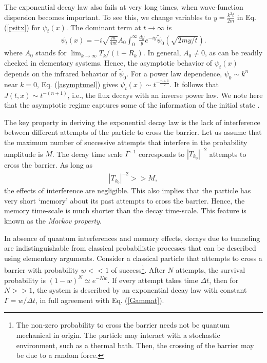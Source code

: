 \documentclass[12pt]{article}
\numberwithin{equation}{section}
\begin{document}
The exponential decay law also fails at very long times, when wave-function dispersion becomes important. To see this, we change variables to  $y = \frac{k^2t}{2m}$ in Eq. (\ref{psitx}) for $\psi_t(x)$. The dominant term at $t \rightarrow \infty$ is
\begin{eqnarray}
\psi_t(x) =  - i \sqrt{\frac{m}{4\pi t}} A_0  \int_0^{\infty} \frac{dy}{y}  e^{-iy} \tilde{\psi}_0(\sqrt{2my/t}). \label{asymptunel}
\end{eqnarray}
where $A_0 $ stands for $\lim_{k\rightarrow \infty} T_k/(1+R_k)$. In general, $A_0 \neq 0$, as can be readily checked in elementary systems. Hence, the asymptotic behavior of $\psi_t(x)$ depends on  the infrared behavior of $\tilde{\psi}_0$. For  a power law dependence, $\psi_0 \sim k^n$ near $k = 0$, Eq. (\ref{asymptunel}) gives $\psi_t(x) \sim t^{-\frac{n+1}{2}}$. It follows that $J(t, x) \sim t^{-(n+1)}$, i.e., the flux decays  with an inverse power law. We note here that the asymptotic regime captures some of the information of the initial state \cite{MDCG}.


The key property in deriving the exponential decay law is the lack of interference between  different attempts of the particle to cross the barrier. Let us assume that the maximum number of successive attempts that interfere in the probability amplitude is $M$. The decay  time scale $\Gamma^{-1}$ corresponds to $|T_{k_0}|^{-2}$  attempts to cross the barrier. As long as
\begin{eqnarray}
|T_{k_0}|^{-2} >> M, \label{tkm}
\end{eqnarray}
the effects of interference are negligible. This also implies that the particle has very short `memory' about its past attempts to cross the barrier. Hence, the memory time-scale  is much shorter than the decay time-scale. This feature is known as the {\em Markov property}.

In absence of quantum interferences and memory effects,  decays due to tunneling are indistinguishable from classical probabilistic processes that can be described using elementary arguments.  Consider a classical particle that attempts to cross a barrier with probability $w << 1$ of success\footnote{The non-zero probability to cross the barrier needs not be quantum mechanical in origin. The particle may interact with a stochastic environment, such as a thermal bath. Then, the crossing of the  barrier may be due to a random force.}. After $N$ attempts, the survival probability is $(1-w)^N \simeq e^{-Nw}$. If every attempt takes time $\Delta t$, then for $N >> 1$, the system is described by an exponential decay law with constant $\Gamma = w /\Delta t$, in full agreement with Eq. (\ref{Gammat}).
\end{document}
